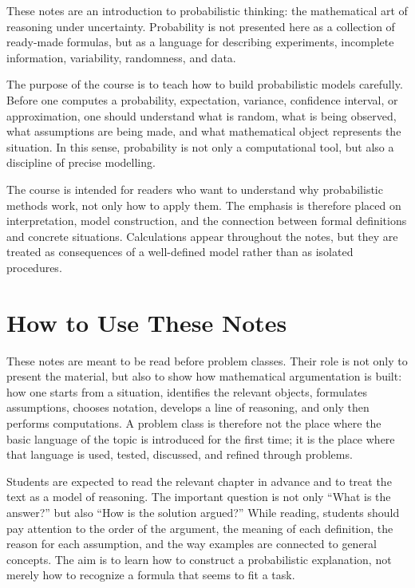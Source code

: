 These notes are an introduction to probabilistic thinking: the mathematical art of reasoning under uncertainty. Probability is not presented here as a collection of ready-made formulas, but as a language for describing experiments, incomplete information, variability, randomness, and data.

The purpose of the course is to teach how to build probabilistic models carefully. Before one computes a probability, expectation, variance, confidence interval, or approximation, one should understand what is random, what is being observed, what assumptions are being made, and what mathematical object represents the situation. In this sense, probability is not only a computational tool, but also a discipline of precise modelling.

The course is intended for readers who want to understand why probabilistic methods work, not only how to apply them. The emphasis is therefore placed on interpretation, model construction, and the connection between formal definitions and concrete situations. Calculations appear throughout the notes, but they are treated as consequences of a well-defined model rather than as isolated procedures.

\section{How to Use These Notes}

These notes are meant to be read before problem classes. Their role is not only to present the material, but also to show how mathematical argumentation is built: how one starts from a situation, identifies the relevant objects, formulates assumptions, chooses notation, develops a line of reasoning, and only then performs computations. A problem class is therefore not the place where the basic language of the topic is introduced for the first time; it is the place where that language is used, tested, discussed, and refined through problems.

Students are expected to read the relevant chapter in advance and to treat the text as a model of reasoning. The important question is not only ``What is the answer?'' but also ``How is the solution argued?'' While reading, students should pay attention to the order of the argument, the meaning of each definition, the reason for each assumption, and the way examples are connected to general concepts. The aim is to learn how to construct a probabilistic explanation, not merely how to recognize a formula that seems to fit a task.

